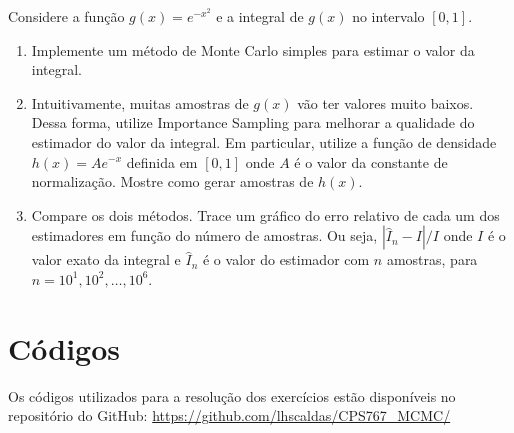 \documentclass[12 pt]{article}
\begin{document}
Considere a função $g(x) = e^{-x^2}$ e a integral de $g(x)$ no intervalo $[0, 1]$.

\begin{enumerate}
    \item Implemente um método de Monte Carlo simples para estimar o valor da integral.
    \begin{tcolorbox}[colframe=black, title=Resposta:]

    \end{tcolorbox}
    \item Intuitivamente, muitas amostras de $g(x)$ vão ter valores muito baixos. Dessa forma, utilize Importance Sampling para melhorar a qualidade do estimador do valor da integral. Em particular, utilize a função de densidade $h(x) = Ae^{-x}$ definida em $[0, 1]$ onde $A$ é o valor da constante de normalização. Mostre como gerar amostras de $h(x)$.
    \begin{tcolorbox}[colframe=black, title=Resposta:]

    \end{tcolorbox}
    \item Compare os dois métodos. Trace um gráfico do erro relativo de cada um dos estimadores em função do número de amostras. Ou seja, $|\hat{I}_n - I|/I$ onde $I$ é o valor exato da integral e $\hat{I}_n$ é o valor do estimador com $n$ amostras, para $n = 10^1, 10^2, \dots, 10^6$.
    \begin{tcolorbox}[colframe=black, title=Resposta:]

    \end{tcolorbox}
\end{enumerate}


\section*{Códigos}

Os códigos utilizados para a resolução dos exercícios estão disponíveis no repositório do GitHub: \url{https://github.com/lhscaldas/CPS767_MCMC/}

\end{document}
